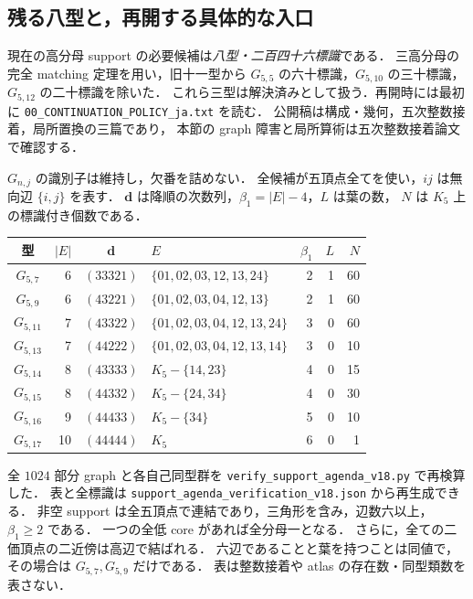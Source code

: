 \subsection{残る八型と，再開する具体的な入口}
\label{ns18:support-agenda}

現在の高分母 support の必要候補は\emph{八型・二百四十六標識}である．
三高分母の完全 matching 定理を用い，旧十一型から
$G_{5,5}$ の六十標識，$G_{5,10}$ の三十標識，$G_{5,12}$ の二十標識を除いた．
これら三型は解決済みとして扱う．再開時には最初に
\nolinkurl{00_CONTINUATION_POLICY_ja.txt} を読む．
公開稿は構成・幾何，五次整数接着，局所置換の三篇であり，
本節の graph 障害と局所算術は五次整数接着論文で確認する．

$G_{n,j}$ の識別子は維持し，欠番を詰めない．
全候補が五頂点全てを使い，$ij$ は無向辺 $\{i,j\}$ を表す．
$\mathbf d$ は降順の次数列，$\beta_1=|E|-4$，$L$ は葉の数，
$N$ は $K_5$ 上の標識付き個数である．
\begin{center}
\footnotesize
\setlength{\tabcolsep}{3pt}
\begin{tabular}{crclrrr}
型&$|E|$&$\mathbf d$&$E$&$\beta_1$&$L$&$N$\\\hline
$G_{5,7}$&6&$(33321)$&$\{01,02,03,12,13,24\}$&2&1&60\\
$G_{5,9}$&6&$(43221)$&$\{01,02,03,04,12,13\}$&2&1&60\\
$G_{5,11}$&7&$(43322)$&$\{01,02,03,04,12,13,24\}$&3&0&60\\
$G_{5,13}$&7&$(44222)$&$\{01,02,03,04,12,13,14\}$&3&0&10\\
$G_{5,14}$&8&$(43333)$&$K_5-\{14,23\}$&4&0&15\\
$G_{5,15}$&8&$(44332)$&$K_5-\{24,34\}$&4&0&30\\
$G_{5,16}$&9&$(44433)$&$K_5-\{34\}$&5&0&10\\
$G_{5,17}$&10&$(44444)$&$K_5$&6&0&1
\end{tabular}
\end{center}

全 $1024$ 部分 graph と各自己同型群を
\nolinkurl{verify_support_agenda_v18.py} で再検算した．
表と全標識は \nolinkurl{support_agenda_verification_v18.json} から再生成できる．
非空 support は全五頂点で連結であり，三角形を含み，辺数六以上，$\beta_1\ge2$ である．
一つの全低 core があれば全分母一となる．
さらに，全ての二価頂点の二近傍は高辺で結ばれる．
六辺であることと葉を持つことは同値で，その場合は $G_{5,7},G_{5,9}$ だけである．
表は整数接着や atlas の存在数・同型類数を表さない．


